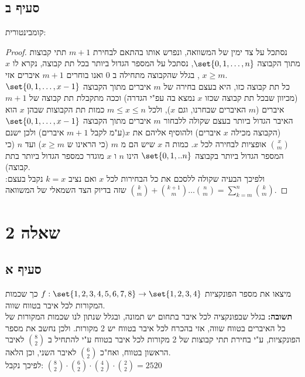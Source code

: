 \documentclass{article}
\DeclarePairedDelimiter\set\{\}
\begin{document}
	\subsection*{סעיף ב}
	קומבינטורית:
	\begin{proof}
		נסתכל על צד ימין של המשוואה, ונפרש אותו בהתאם לבחירת $m+1$ תתי קבוצות מתוך הקבוצה $\set{0,1,\dots, n}$, נסתכל על המספר הגדול ביותר בכל תת קבוצה, נקרא לו $x$,
		בגלל שהקבוצה מתחילה ב $0$ ואנו בוחרים $m+1$ איברים אזי $x \geq m$. \\
		כל תת קבוצה כזו, היא בעצם בחירה של $m$ איברים מתוך הקבוצה $\set{0,1,\dots,x-1}$(מכיוון שבכל תת קבוצה שכזו $x$ נמצא בה עפ"י הגדרה) וככה מתקבלת תת קבוצה של $m+1$ איברים ($m$ האיברים שבחרנו, וגם $x$),
		ולכל $m \leq x \leq n$ כמות תת הקבוצות שבהן $x$ הוא האיבר הגדול ביותר בעצם שקולה ללבחור $m$ איברים מתוך הקבוצה $\set{0,1,\dots,x-1}$(הקבוצה מכילה $x$ איברים) ולהוסיף אליהם את $x$(ע"מ לקבל $m+1$ איברים) ולכן ישנם ${x \choose m}$ אופציות לבחירה לכל $x$.
		כמות ה $x$ שיש הם מ $m$ (כי הראינו ש $x \geq m$) ועד $n$ (כי המספר הגדול ביותר בקבוצה $\set{0,1,..n}$ הינו $n$ ו $x$ מוגדר כמספר הגדול ביותר בתת קבוצה). \\
		ולפיכך הבעיה שקולה ללסכם את כל הבחירות לכל $x$ ואם נציב $k=x$ נקבל בעצם:
		${k \choose m} + {k+1 \choose m} \dots {n \choose m} = \sum_{k=m}^n{k \choose m}$
		שזה בדיוק הצד השמאלי של המשוואה.
	\end{proof}

	\pagebreak

	\section*{שאלה 2}
	\subsection*{סעיף א}
	מיצאו את מספר הפונקציות $f: \set{1,2,3,4,5,6,7,8} \to \set {1,2,3,4}$ כך שכמות המקורות לכל איבר בטווח שווה. \\
	\textbf{תשובה:} בגלל שבפונקציה לכל איבר בתחום יש תמונה, ובגלל שנתון לנו שכמות המקורות של כל האיברים בטווח שווה, אזי בהכרח לכל איבר בטווח יש 2 מקורות.
	ולכן נחשב את מספר הפונקציות, ע"י בחירת תתי קבוצות של 2 מקורות לכל איבר בטווח ע"י להתחיל ב ${8 \choose 2}$ לאיבר הראשון בטווח, ואח"כ ${6 \choose 2}$ לאיבר השני, וכן הלאה. \\
	לפיכך נקבל: ${8 \choose 2} \cdot {6 \choose 2} \cdot {4 \choose 2} \cdot {2 \choose 2} = 2520$
\end{document}
